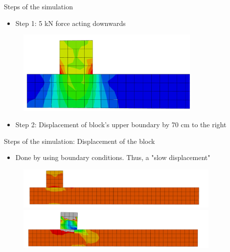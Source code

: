 \documentclass{beamer}
\begin{document}
\begin{frame}{Steps of the simulation}

\begin{itemize}
\item Step 1: 5 kN force acting downwards
\end{itemize}

\begin{figure}
\includegraphics[width=9cm]{mises.pdf}
\end{figure}

\begin{itemize}
\item Step 2: Displacement of block's upper boundary by 70 cm to the right
\end{itemize}

\end{frame}

\begin{frame}{Steps of the simulation: Displacement of the block}

\begin{itemize}
\item Done by using boundary conditions. Thus, a "slow displacement"
\end{itemize}

\begin{figure}
\includegraphics[width=10cm]{anim1.pdf}\\
\includegraphics[width=10cm]{anim2.pdf}
\end{figure}

\end{frame}
\end{document}
